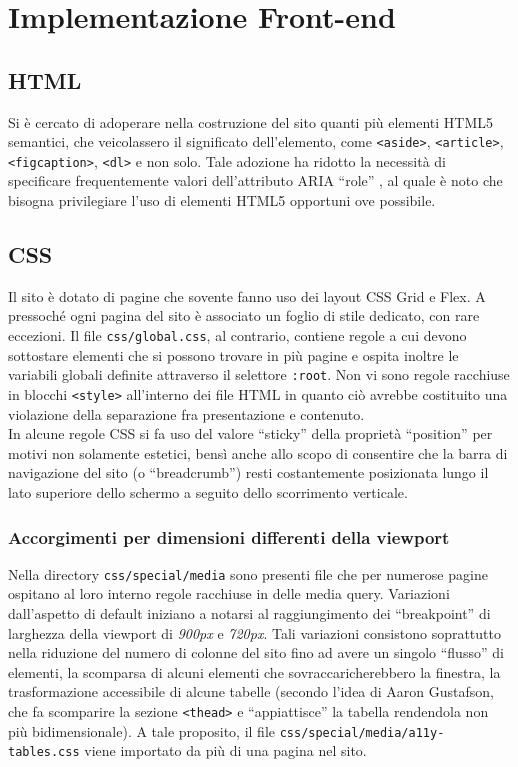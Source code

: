 \section{Implementazione Front-end}
\label{sec:front-end}

\subsection{HTML}
Si è cercato di adoperare nella costruzione del sito quanti più elementi HTML5 semantici, che veicolassero il significato dell'elemento, come \texttt{<aside>}, \texttt{<article>}, \texttt{<figcaption>}, \texttt{<dl>} e non solo. Tale adozione ha ridotto la necessità di specificare frequentemente valori dell'attributo ARIA “role” , al quale è noto che bisogna privilegiare l'uso di elementi HTML5 opportuni ove possibile.

\subsection{CSS}
Il sito è dotato di pagine che sovente fanno uso dei layout CSS Grid e Flex.
A pressoché ogni pagina del sito è associato un foglio di stile dedicato, con rare eccezioni.
Il file \texttt{css/global.css}, al contrario, contiene regole a cui devono sottostare elementi che si possono trovare in più pagine e ospita inoltre le variabili globali definite attraverso il selettore \texttt{:root}.
Non vi sono regole racchiuse in blocchi \texttt{<style>} all'interno dei file HTML in quanto ciò avrebbe costituito una violazione della separazione fra presentazione e contenuto. \\
In alcune regole CSS si fa uso del valore “sticky” della proprietà “position” per motivi non solamente estetici, bensì anche allo scopo di consentire che la barra di navigazione del sito (o “breadcrumb”) resti costantemente posizionata lungo il lato superiore dello schermo a seguito dello scorrimento verticale.

\subsubsection{Accorgimenti per dimensioni differenti della viewport}
Nella directory \texttt{css/special/media} sono presenti file che per numerose pagine ospitano al loro interno regole racchiuse in delle media query. Variazioni dall'aspetto di default iniziano a notarsi al raggiungimento dei “breakpoint” di larghezza della viewport di \textit{900px} e \textit{720px}. Tali variazioni consistono soprattutto nella riduzione del numero di colonne del sito fino ad avere un singolo “flusso” di elementi, la scomparsa di alcuni elementi che sovraccaricherebbero la finestra, la trasformazione accessibile di alcune tabelle (secondo l'idea di Aaron Gustafson, che fa scomparire la sezione \texttt{<thead>} e “appiattisce” la tabella rendendola non più bidimensionale). A tale proposito, il file \texttt{css/special/media/a11y-tables.css} viene importato da più di una pagina nel sito.

